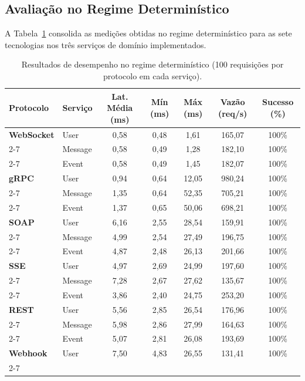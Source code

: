 \documentclass[a4paper,12pt]{article}
\begin{document}
\subsection{Avaliação no Regime Determinístico}

A Tabela~\ref{tab:resultados_deterministicos} consolida as medições obtidas no regime determinístico para as sete tecnologias nos três serviços de domínio implementados.

\begin{table}[H]
\centering
\scriptsize
\caption{Resultados de desempenho no regime determinístico (100 requisições por protocolo em cada serviço).}
\label{tab:resultados_deterministicos}
\begin{tabularx}{\textwidth}{|l|l|c|c|c|c|c|}
\hline
\textbf{Protocolo} & \textbf{Serviço} & \textbf{Lat. Média (ms)} & \textbf{Mín (ms)} & \textbf{Máx (ms)} & \textbf{Vazão (req/s)} & \textbf{Sucesso (\%)} \\ \hline
\textbf{WebSocket} & User & 0,58 & 0,48 & 1,61 & 165,07 & 100\% \\ \cline{2-7}
 & Message & 0,58 & 0,49 & 1,28 & 182,10 & 100\% \\ \cline{2-7}
 & Event & 0,58 & 0,49 & 1,45 & 182,07 & 100\% \\ \hline
\textbf{gRPC} & User & 0,94 & 0,64 & 12,05 & 980,24 & 100\% \\ \cline{2-7}
 & Message & 1,35 & 0,64 & 52,35 & 705,21 & 100\% \\ \cline{2-7}
 & Event & 1,37 & 0,65 & 50,06 & 698,21 & 100\% \\ \hline
\textbf{SOAP} & User & 6,16 & 2,55 & 28,54 & 159,91 & 100\% \\ \cline{2-7}
 & Message & 4,99 & 2,54 & 27,49 & 196,75 & 100\% \\ \cline{2-7}
 & Event & 4,87 & 2,48 & 26,13 & 201,66 & 100\% \\ \hline
\textbf{SSE} & User & 4,97 & 2,69 & 24,99 & 197,60 & 100\% \\ \cline{2-7}
 & Message & 7,28 & 2,67 & 27,62 & 135,67 & 100\% \\ \cline{2-7}
 & Event & 3,86 & 2,40 & 24,75 & 253,20 & 100\% \\ \hline
\textbf{REST} & User & 5,56 & 2,85 & 26,54 & 176,96 & 100\% \\ \cline{2-7}
 & Message & 5,98 & 2,86 & 27,99 & 164,63 & 100\% \\ \cline{2-7}
 & Event & 5,07 & 2,81 & 26,08 & 193,69 & 100\% \\ \hline
\textbf{Webhook} & User & 7,50 & 4,83 & 26,55 & 131,41 & 100\% \\ \cline{2-7}

\end{tabularx}
\end{table}
\end{document}
